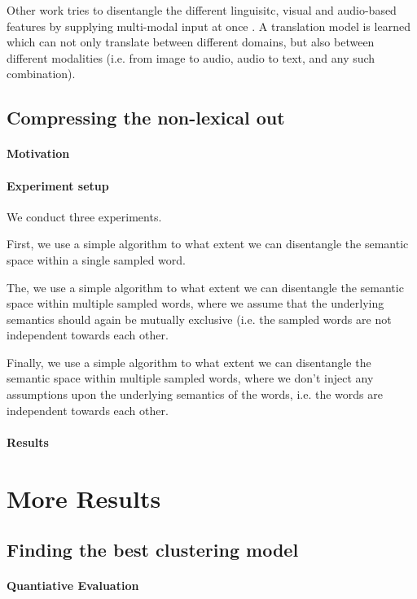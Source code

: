 \documentclass[a4paper,12pt,oneside,openright]{report}
\begin{document}
Other work tries to disentangle the different linguisitc, visual and audio-based features by supplying multi-modal input at once \cite{ma19}.
A translation model is learned which can not only translate between different domains, but also between different modalities (i.e. from image to audio, audio to text, and any such combination).


\section{Compressing the non-lexical out}

\subsubsection{Motivation}
\subsubsection{Experiment setup}

We conduct three experiments.

First, we use a simple algorithm to what extent we can disentangle the semantic space within a single sampled word.

The, we use a simple algorithm to what extent we can disentangle the semantic space within multiple sampled words, where we assume that the underlying semantics should again be mutually exclusive (i.e. the sampled words are not independent towards each other.

Finally, we use a simple algorithm to what extent we can disentangle the semantic space within multiple sampled words, where we don't inject any assumptions upon the underlying semantics of the words, i.e. the words are independent towards each other.


\subsubsection{Results}


\chapter{More Results}

\section{Finding the best clustering model}\label{section:more_clustering_results}

\subsubsection{Quantiative Evaluation}
\end{document}
